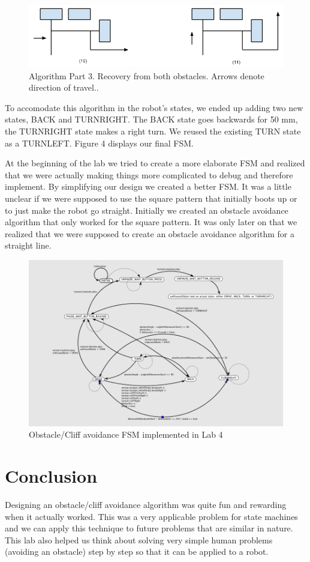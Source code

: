 \documentclass[10pt,titlepage]{article}
\begin{document}
    \begin{figure}[H]
        \includegraphics[keepaspectratio, width=1\textwidth]{../lab4_data/c.png}
        \caption{Algorithm Part 3. Recovery from both obstacles. Arrows denote direction of travel..}
    \end{figure}
    
     
  To accomodate this algorithm in the robot's states, we ended up adding two new states, BACK and TURNRIGHT. The BACK state goes backwards for 50 mm, the TURNRIGHT state makes a right turn. We reused the existing TURN state as a TURNLEFT. Figure 4 displays our final FSM.

  At the beginning of the lab we tried to create a more elaborate FSM and realized that we were actually making things more complicated to debug and therefore implement. By simplifying our design we created a better FSM. It was a little unclear if we were supposed to use the square pattern that initially boots up or to just make the robot go straight. Initially we created an obstacle avoidance algorithm that only worked for the square pattern. It was only later on that we realized that we were supposed to create an obstacle avoidance algorithm for a straight line.
    
    \begin{figure}[H]
      \centering
        \includegraphics[width=1\textwidth]{../lab4_data/FSMLab4v2}
      \caption{Obstacle/Cliff avoidance FSM implemented in Lab 4}
    \end{figure}

  \section{Conclusion}
    Designing an obstacle/cliff avoidance algorithm was quite fun and rewarding when it actually worked. This was a very applicable problem for state machines and we can apply this technique to future problems that are similar in nature. This lab also helped us think about solving very simple human problems (avoiding an obstacle) step by step so that it can be applied to a robot.
\end{document}
